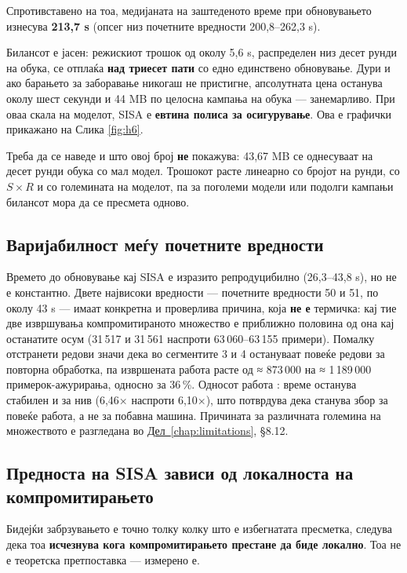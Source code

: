 Спротивставено на тоа, медијаната на заштеденото време при обновувањето изнесува
\textbf{213,7 s} (опсег низ почетните вредности 200,8–262,3 s).

Билансот е јасен: режискиот трошок од околу 5,6 s, распределен низ десет рунди на обука, се
отплаќа \textbf{над триесет пати} со едно единствено обновување. Дури и ако барањето за
заборавање никогаш не пристигне, апсолутната цена останува околу шест секунди и 44 MB по
целосна кампања на обука --- занемарливо. При оваа скала на моделот, SISA е \textbf{евтина
полиса за осигурување}. Ова е графички прикажано на Слика \ref{fig:h6}.

Треба да се наведе и што овој број \textbf{не} покажува: 43,67 MB се однесуваат на десет рунди
обука со мал модел. Трошокот расте линеарно со бројот на рунди, со $S \times R$ и со
големината на моделот, па за поголеми модели или подолги кампањи билансот мора да се
пресмета одново.

\subsection{Варијабилност меѓу почетните вредности}

Времето до обновување кај SISA е изразито репродуцибилно (26,3–43,8 s), но не е константно.
Двете највисоки вредности --- почетните вредности 50 и 51, по околу 43 s --- имаат конкретна и
проверлива причина, која \textbf{не е} термичка: кај тие две извршувања компромитираното множество
е приближно половина од она кај останатите осум (31\,517 и 31\,561 наспроти 63\,060–63\,155
примери). Помалку отстранети редови значи дека во сегментите 3 и 4 остануваат повеќе редови
за повторна обработка, па извршената работа расте од ≈ 873\,000 на ≈ 1\,189\,000
примерок-ажурирања, односно за 36\,\%. Односот работа : време останува стабилен и за нив
(6,46× наспроти 6,10×), што потврдува дека станува збор за повеќе работа, а не за побавна
машина. Причината за различната големина на множеството е разгледана во
\hyperref[chap:limitations]{Дел~\ref*{chap:limitations}}, §8.12.

\subsection{Предноста на SISA зависи од локалноста на компромитирањето}

Бидејќи забрзувањето е точно толку колку што е избегнатата пресметка, следува дека тоа
\textbf{исчезнува кога компромитирањето престане да биде локално}. Тоа не е теоретска
претпоставка --- измерено е.

